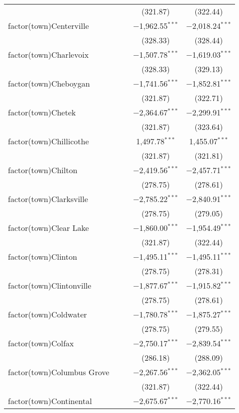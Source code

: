 \begin{table}[!htbp]
\begin{tabular}{@{\extracolsep{5pt}}lcccc}
  &  &  & (321.87) & (322.44) \\ 
  factor(town)Centerville &  &  & $-$1,962.55$^{***}$ & $-$2,018.24$^{***}$ \\ 
  &  &  & (328.33) & (328.44) \\ 
  factor(town)Charlevoix &  &  & $-$1,507.78$^{***}$ & $-$1,619.03$^{***}$ \\ 
  &  &  & (328.33) & (329.13) \\ 
  factor(town)Cheboygan &  &  & $-$1,741.56$^{***}$ & $-$1,852.81$^{***}$ \\ 
  &  &  & (321.87) & (322.71) \\ 
  factor(town)Chetek &  &  & $-$2,364.67$^{***}$ & $-$2,299.91$^{***}$ \\ 
  &  &  & (321.87) & (323.64) \\ 
  factor(town)Chillicothe &  &  & 1,497.78$^{***}$ & 1,455.07$^{***}$ \\ 
  &  &  & (321.87) & (321.81) \\ 
  factor(town)Chilton &  &  & $-$2,419.56$^{***}$ & $-$2,457.71$^{***}$ \\ 
  &  &  & (278.75) & (278.61) \\ 
  factor(town)Clarksville &  &  & $-$2,785.22$^{***}$ & $-$2,840.91$^{***}$ \\ 
  &  &  & (278.75) & (279.05) \\ 
  factor(town)Clear Lake &  &  & $-$1,860.00$^{***}$ & $-$1,954.49$^{***}$ \\ 
  &  &  & (321.87) & (322.44) \\ 
  factor(town)Clinton &  &  & $-$1,495.11$^{***}$ & $-$1,495.11$^{***}$ \\ 
  &  &  & (278.75) & (278.31) \\ 
  factor(town)Clintonville &  &  & $-$1,877.67$^{***}$ & $-$1,915.82$^{***}$ \\ 
  &  &  & (278.75) & (278.61) \\ 
  factor(town)Coldwater &  &  & $-$1,780.78$^{***}$ & $-$1,875.27$^{***}$ \\ 
  &  &  & (278.75) & (279.55) \\ 
  factor(town)Colfax &  &  & $-$2,750.17$^{***}$ & $-$2,839.54$^{***}$ \\ 
  &  &  & (286.18) & (288.09) \\ 
  factor(town)Columbus Grove &  &  & $-$2,267.56$^{***}$ & $-$2,362.05$^{***}$ \\ 
  &  &  & (321.87) & (322.44) \\ 
  factor(town)Continental &  &  & $-$2,675.67$^{***}$ & $-$2,770.16$^{***}$ \\ 

\end{tabular}
\end{table}
